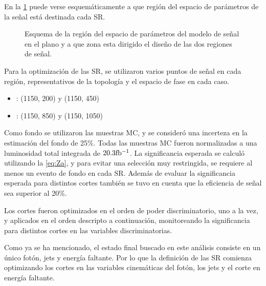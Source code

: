 En la \cref{fig:srs_motivation} puede verse esquemáticamente a que región del espacio
de parámetros de la señal {\mgmn} está destinada cada SR.

\begin{figure}[!htbp]
  \centering
    \resizebox{0.5\textwidth}{!}{
      
      }
    \caption{Esquema de la región del espacio de parámetros del modelo de señal en el
    plano {\mgmn} y a que zona esta dirigido el diseño de las dos regiones de señal.}
  \label{fig:srs_motivation}
\end{figure}


Para la optimización de las SR, se utilizaron varios puntos de señal en cada región,
representativos de la topología y el espacio de fase en cada caso.

\begin{itemize}\itemsep0.2cm\parskip0.2cm
\item {\SRL}: (1150, 200) y (1150, 450)
\item {\SRH}: (1150, 850) y (1150, 1050)
\end{itemize}


Como fondo se utilizaron las muestras MC, y se consideró una incerteza en la estimación del
fondo de 25\%. Todas las muestras MC fueron normalizadas a una luminosidad total
integrada de $20.3 \mbox{fb$^{-1}$}$. La significancia esperada se calculó utilizando la
\cref{eq:Za}, y para evitar una selección muy restringida, se requiere al menos
un evento de fondo en cada SR. Además de evaluar la significancia esperada para
distintos cortes también se tuvo en cuenta que la eficiencia de señal sea
superior al 20\%.

Los cortes fueron optimizados en el orden de poder discriminatorio, uno a la
vez, y aplicados en el orden descripto a continuación, monitoreando la
significancia para distintos cortes en las variables discriminatorias.

Como ya se ha mencionado, el estado final buscado en este análisis consiste en un
único fotón, jets y energía faltante. Por lo que la definición de las SR
comienza optimizando los cortes en las variables cinemáticas del fotón, los jets
y el corte en energía faltante.


